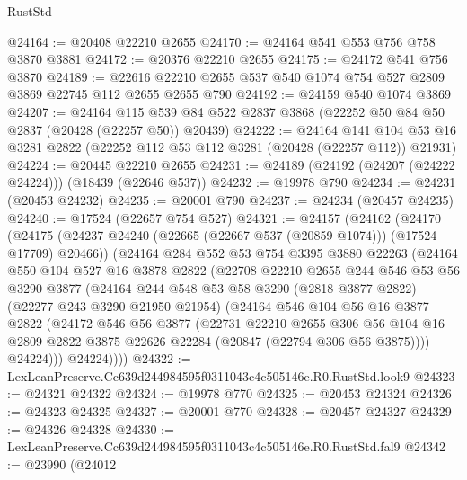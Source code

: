 \begin{lexlean}{RustStd}
\begin{coremodule}
@24164 := @20408 @22210 @2655
@24170 := @24164 @541 @553 @756 @758 @3870 @3881
@24172 := @20376 @22210 @2655
@24175 := @24172 @541 @756 @3870
@24189 := @22616 @22210 @2655 @537 @540 @1074 @754 @527 @2809 @3869 @22745 @112 @2655 @2655 @790
@24192 := @24159 @540 @1074 @3869
@24207 := @24164
    @115
    @539
    @84
    @522
    @2837
    @3868
    (@22252 @50 @84 @50 @2837 (@20428 (@22257 @50)) @20439)
@24222 := @24164
    @141
    @104
    @53
    @16
    @3281
    @2822
    (@22252 @112 @53 @112 @3281 (@20428 (@22257 @112)) @21931)
@24224 := @20445 @22210 @2655
@24231 := @24189 (@24192 (@24207 (@24222 @24224))) (@18439 (@22646 @537))
@24232 := @19978 @790
@24234 := @24231 (@20453 @24232)
@24235 := @20001 @790
@24237 := @24234 (@20457 @24235)
@24240 := @17524 (@22657 @754 @527)
@24321 := @24157
    (@24162
      (@24170
        (@24175 (@24237 @24240 (@22665 (@22667 @537 (@20859 @1074))) (@17524 @17709) @20466))
        (@24164
          @284
          @552
          @53
          @754
          @3395
          @3880
          @22263
          (@24164
            @550
            @104
            @527
            @16
            @3878
            @2822
            (@22708
              @22210
              @2655
              @244
              @546
              @53
              @56
              @3290
              @3877
              (@24164
                @244
                @548
                @53
                @58
                @3290
                (@2818 @3877 @2822)
                (@22277 @243 @3290 @21950 @21954)
                (@24164
                  @546
                  @104
                  @56
                  @16
                  @3877
                  @2822
                  (@24172
                    @546
                    @56
                    @3877
                    (@22731
                      @22210
                      @2655
                      @306
                      @56
                      @104
                      @16
                      @2809
                      @2822
                      @3875
                      @22626
                      @22284
                      (@20847 (@22794 @306 @56 @3875))))
                  @24224)))
            @24224))))
@24322 := LexLeanPreserve.Cc639d244984595f0311043c4c505146e.R0.RustStd.look9
@24323 := @24321 @24322
@24324 := @19978 @770
@24325 := @20453 @24324
@24326 := @24323 @24325
@24327 := @20001 @770
@24328 := @20457 @24327
@24329 := @24326 @24328
@24330 := LexLeanPreserve.Cc639d244984595f0311043c4c505146e.R0.RustStd.fal9
@24342 := @23990
    (@24012

\end{coremodule}
\end{lexlean}
